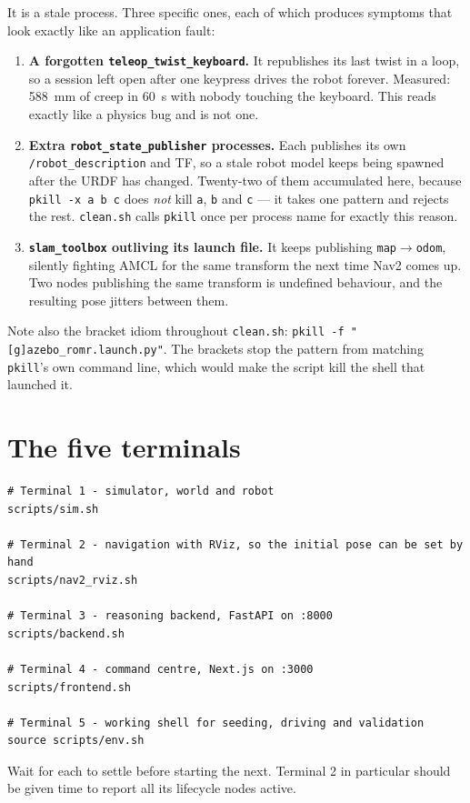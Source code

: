 \documentclass[11pt,a4paper]{report}
\newcommand{\file}[1]{\texttt{\small #1}}
\begin{document}
\begin{warnbox}
It is a stale process. Three specific ones, each of which produces symptoms
that look exactly like an application fault:

\begin{enumerate}[leftmargin=1.6em,itemsep=3pt]
\item \textbf{A forgotten \file{teleop\_twist\_keyboard}.} It republishes its
last twist in a loop, so a session left open after one keypress drives the
robot forever. Measured: \SI{588}{\milli\metre} of creep in \SI{60}{\second}
with nobody touching the keyboard. This reads exactly like a physics bug and is
not one.

\item \textbf{Extra \file{robot\_state\_publisher} processes.} Each publishes
its own \file{/robot\_description} and TF, so a stale robot model keeps being
spawned after the URDF has changed. Twenty-two of them accumulated here,
because \file{pkill -x a b c} does \emph{not} kill \file{a}, \file{b} and
\file{c} --- it takes one pattern and rejects the rest. \file{clean.sh} calls
\file{pkill} once per process name for exactly this reason.

\item \textbf{\file{slam\_toolbox} outliving its launch file.} It keeps
publishing \file{map}$\rightarrow$\file{odom}, silently fighting AMCL for the
same transform the next time Nav2 comes up. Two nodes publishing the same
transform is undefined behaviour, and the resulting pose jitters between them.
\end{enumerate}

Note also the bracket idiom throughout \file{clean.sh}:
\file{pkill -f "[g]azebo\_romr.launch.py"}. The brackets stop the pattern from
matching \file{pkill}'s own command line, which would make the script kill the
shell that launched it.
\end{warnbox}

\section{The five terminals}

\begin{plain}
\begin{verbatim}
# Terminal 1 - simulator, world and robot
scripts/sim.sh

# Terminal 2 - navigation with RViz, so the initial pose can be set by hand
scripts/nav2_rviz.sh

# Terminal 3 - reasoning backend, FastAPI on :8000
scripts/backend.sh

# Terminal 4 - command centre, Next.js on :3000
scripts/frontend.sh

# Terminal 5 - working shell for seeding, driving and validation
source scripts/env.sh
\end{verbatim}
Wait for each to settle before starting the next. Terminal 2 in particular
should be given time to report all its lifecycle nodes active.
\end{plain}
\end{document}
